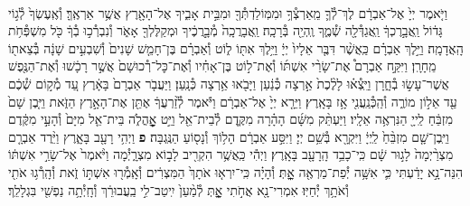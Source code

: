 \documentclass[twoside, openany, parskip=half, 11pt]{book}
\begin{document}
\begin{footnotesize}
\begin{multicols}{2}
\\
וַיֹּ֤אמֶר יְיָ֙ אֶל־אַבְרָ֔ם לֶךְ־לְ֯ךָ֛ מֵֽאַרְצְ֯ךָ֥ וּמִמּֽוֹלַדְתְּ֯ךָ֖ וּמִבֵּ֣ית אָבִ֑יךָ אֶל־הָאָ֖רֶץ אֲשֶׁ֥ר אַרְאֶֽךָּ׃ וְ֯אֶֽעֶשְׂךָ֙ לְ֯ג֣וֹי גָּד֔וֹל וַֽאֲבָ֣רֶכְךָ֔ וַֽאֲגַדְּ֯לָ֖ה שְׁ֯מֶ֑ךָ וֶֽהְיֵ֖ה בְּ֯רָכָֽה׃ וַֽאֲבָרֲכָֽה֙ מְ֯בָ֣רֲכֶ֔יךָ וּמְקַלֶּלְךָ֖ אָאֹ֑ר וְ֯נִבְרְ֯כ֣וּ בְ֯ךָ֔ כֹּ֖ל מִשְׁפְּ֯חֹ֥ת הָֽאֲדָמָֽה׃  וַיֵּ֣לֶךְ אַבְרָ֗ם כַּֽאֲשֶׁ֨ר דִּבֶּ֤ר אֵלָיו֙ יְיָ֔ וַיֵּ֥לֶךְ אִתּ֖וֹ ל֑וֹט וְ֯אַבְרָ֗ם בֶּן־חָמֵ֤שׁ שָׁנִים֙ וְ֯שִׁבְעִ֣ים שָׁנָ֔ה בְּ֯צֵאת֖וֹ מֵֽחָרָֽן׃ וַיִּקַּ֣ח אַבְרָם֩ אֶת־שָׂרַ֨י אִשְׁתּ֜וֹ וְ֯אֶת־ל֣וֹט בֶּן־אָחִ֗יו וְ֯אֶת־כׇּל־רְ֯כוּשָׁם֙ אֲשֶׁ֣ר רָכָ֔שׁוּ וְ֯אֶת־הַנֶּ֖פֶשׁ אֲשֶׁר־עָשׂ֣וּ בְ֯חָ֑רָן וַיֵּֽצְ֯א֗וּ לָלֶ֨כֶת֙ אַ֣רְצָה כְּ֯נַ֔עַן וַיָּבֹ֖אוּ אַ֥רְצָה כְּ֯נָֽעַן׃ וַיַּעֲבֹ֤ר אַבְרָם֙ בָּאָ֔רֶץ עַ֚ד מְ֯ק֣וֹם שְׁ֯כֶ֔ם עַ֖ד אֵל֣וֹן מוֹרֶ֑ה וְ֯הַֽכְּ֯נַֽעֲנִ֖י אָ֥ז בָּאָֽרֶץ׃ וַיֵּרָ֤א יְיָ֙ אֶל־אַבְרָ֔ם וַיֹּ֕אמֶר לְ֯זַ֨רְעֲךָ֔ אֶתֵּ֖ן אֶת־הָאָ֣רֶץ הַזֹּ֑את וַיִּ֤בֶן שָׁם֙ מִזְבֵּ֔חַ לַֽייָ֖ הַנִּרְאֶ֥ה אֵלָֽיו׃ וַיַּעְתֵּ֨ק מִשָּׁ֜ם הָהָ֗רָה מִקֶּ֛דֶם לְ֯בֵית־אֵ֖ל וַיֵּ֣ט אׇׇׇׇׇׇׇׇׇׇׇׇֽהֳלֹ֑ה בֵּית־אֵ֤ל מִיָּם֙ וְ֯הָעַ֣י מִקֶּ֔דֶם וַיִּֽבֶן־שָׁ֤ם מִזְבֵּ֨חַ֙ לַֽיְיָ֔ וַיִּקְרָ֖א בְּ֯שֵׁ֥ם יְיָ׃ וַיִּסַּ֣ע אַבְרָ֔ם הָל֥וֹךְ וְ֯נָס֖וֹעַ הַנֶּֽגְבָּה׃ \textbf{פ}
 וַיְהִ֥י רָעָ֖ב בָּאָ֑רֶץ וַיֵּ֨רֶד אַבְרָ֤ם מִצְרַ֨יְמָה֙ לָג֣וּר שָׁ֔ם כִּֽי־כָבֵ֥ד הָֽרָעָ֖ב בָּאָֽרֶץ׃ וַיְהִ֕י כַּֽאֲשֶׁ֥ר הִקְרִ֖יב לָב֣וֹא מִצְרָ֑יְ֯מָה וַיֹּ֨אמֶר֙ אֶל־שָׂרַ֣י אִשְׁתּ֔וֹ הִנֵּה־נָ֣א יָדַ֔עְתִּי כִּ֛י אִשָּׁ֥ה יְ֯פַת־מַרְאֶ֖ה אׇׇׇׇׇׇֽתְּ׃ וְ֯הָיָ֗ה כִּֽי־יִרְא֤וּ אֹתָךְ֙ הַמִּצְרִ֔ים וְ֯אָֽמְ֯ר֖וּ אִשְׁתּ֣וֹ זֹ֑את וְ֯הָֽרְ֯ג֥וּ אֹתִ֖י וְ֯אֹתָ֥ךְ יְ֯חַיּֽוּ׃ אִמְרִי־נָ֖א אֲחֹ֣תִי אׇׇׇׇ֑תְּ לְ֯מַ֨עַן֙ יִֽיטַב־לִ֣י בַֽעֲבוּרֵ֔ךְ וְ֯חָֽיְ֯תָ֥ה נַפְשִׁ֖י בִּגְלָלֵֽךְ׃


\end{multicols}
\end{footnotesize}
\end{document}
